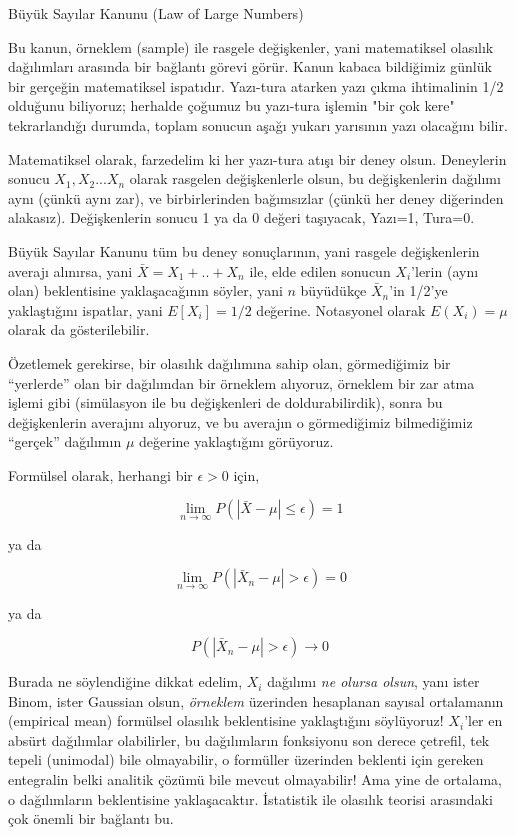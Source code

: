 \documentclass[12pt,fleqn]{article}\usepackage{../../common}
\begin{document}
Büyük Sayılar Kanunu (Law of Large Numbers)

Bu kanun, örneklem (sample) ile rasgele değişkenler, yani matematiksel
olasılık dağılımları arasında bir bağlantı görevi görür. Kanun kabaca
bildiğimiz günlük bir gerçeğin matematiksel ispatıdır. Yazı-tura atarken
yazı çıkma ihtimalinin 1/2 olduğunu biliyoruz; herhalde çoğumuz bu
yazı-tura işlemin "bir çok kere" tekrarlandığı durumda, toplam sonucun
aşağı yukarı yarısının yazı olacağını bilir.

Matematiksel olarak, farzedelim ki her yazı-tura atışı bir deney
olsun. Deneylerin sonucu $X_1, X_2...X_n$ olarak rasgelen değişkenlerle
olsun, bu değişkenlerin dağılımı aynı (çünkü aynı zar), ve birbirlerinden
bağımsızlar (çünkü her deney diğerinden alakasız). Değişkenlerin sonucu 1
ya da 0 değeri taşıyacak, Yazı=1, Tura=0.

Büyük Sayılar Kanunu tüm bu deney sonuçlarının, yani rasgele değişkenlerin
averajı alınırsa, yani $\bar{X} = X_1 + .. + X_n$ ile, elde edilen sonucun
$X_i$'lerin (aynı olan) beklentisine yaklaşacağının söyler, yani $n$ büyüdükçe
$\bar{X}_n$'in 1/2'ye yaklaştığını ispatlar, yani $E[X_i] = 1/2$
değerine. Notasyonel olarak $E(X_i) = \mu$ olarak da gösterilebilir.

Özetlemek gerekirse, bir olasılık dağılımına sahip olan, görmediğimiz bir
``yerlerde'' olan bir dağılımdan bir örneklem alıyoruz, örneklem bir zar
atma işlemi gibi (simülasyon ile bu değişkenleri de doldurabilirdik), sonra
bu değişkenlerin averajını alıyoruz, ve bu averajın o görmediğimiz
bilmediğimiz ``gerçek'' dağılımın $\mu$ değerine yaklaştığını görüyoruz. 

Formülsel olarak, herhangi bir $\epsilon > 0$ için,

$$ \lim_{n \to \infty} P(|\bar{X} - \mu| \le \epsilon) = 1$$

ya da

 $$ \lim_{n \to \infty} P(|\bar{X}_n-\mu| > \epsilon) = 0 $$

ya da 

$$ P(|\bar{X}_n-\mu| > \epsilon) \rightarrow 0 $$

Burada ne söylendiğine dikkat edelim, $X_i$ dağılımı {\em ne olursa olsun}, yanı
ister Binom, ister Gaussian olsun, {\em örneklem} üzerinden hesaplanan sayısal
ortalamanın (empirical mean) formülsel olasılık beklentisine yaklaştığını
söylüyoruz! $X_i$'ler en absürt dağılımlar olabilirler, bu dağılımların
fonksiyonu son derece çetrefil, tek tepeli (unimodal) bile olmayabilir, o
formüller üzerinden beklenti için gereken entegralin belki analitik çözümü bile
mevcut olmayabilir! Ama yine de ortalama, o dağılımların beklentisine
yaklaşacaktır.  İstatistik ile olasılık teorisi arasındaki çok önemli bir
bağlantı bu.
\end{document}
